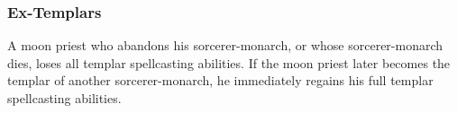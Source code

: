 {\subsubsection{Ex-Templars}
A moon priest who abandons his sorcerer-monarch, or whose sorcerer-monarch dies, loses all templar spellcasting abilities. If the moon priest later becomes the templar of another sorcerer-monarch, he immediately regains his full templar spellcasting abilities.
}

